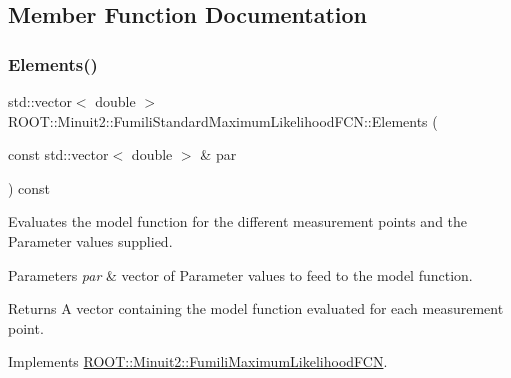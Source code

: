 \subsection{Member Function Documentation}
\mbox{\label{classROOT_1_1Minuit2_1_1FumiliStandardMaximumLikelihoodFCN_a19866fac44787dee8e2a6a35e7a15fe1}} 
\subsubsection{\texorpdfstring{Elements()}{Elements()}\hspace{0.1cm}{\footnotesize\ttfamily [1/2]}}
{\footnotesize\ttfamily std\+::vector$<$ double $>$ R\+O\+O\+T\+::\+Minuit2\+::\+Fumili\+Standard\+Maximum\+Likelihood\+F\+C\+N\+::\+Elements (\begin{DoxyParamCaption}\item[{const std\+::vector$<$ double $>$ \&}]{par }\end{DoxyParamCaption}) const\hspace{0.3cm}{\ttfamily [virtual]}}

Evaluates the model function for the different measurement points and the Parameter values supplied.


\begin{DoxyParams}{Parameters}
{\em par} & vector of Parameter values to feed to the model function.\\
\hline
\end{DoxyParams}
\begin{DoxyReturn}{Returns}
A vector containing the model function evaluated for each measurement point. 
\end{DoxyReturn}


Implements \mbox{\hyperlink{classROOT_1_1Minuit2_1_1FumiliMaximumLikelihoodFCN_a20aa81dc23ba61ed49ba78f4f9627e59}{R\+O\+O\+T\+::\+Minuit2\+::\+Fumili\+Maximum\+Likelihood\+F\+CN}}.

